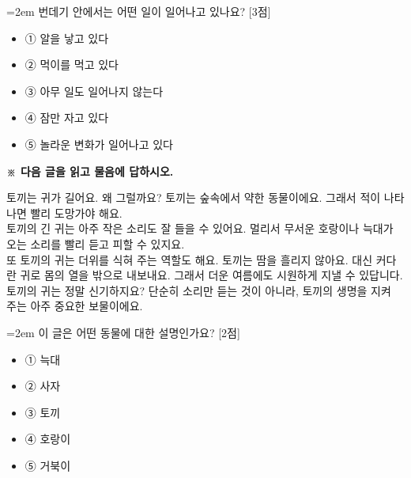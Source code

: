 \documentclass[12pt,a4paper]{article}
\newcommand{\qnum}[1]{%
  \tikz[baseline=(num.base)]{%
    \node[circle, fill=numCircle, text=white, inner sep=0pt,
          minimum size=18pt, font=\small\bfseries] (num) {#1};%
  }%
}
\newcommand{\pts}[1]{%
  \hfill\textcolor{ptsBadge}{[#1점]}%
}
\begin{document}
\vspace{4mm}
\begin{samepage}
{\hangindent=2em
\qnum{24}\enspace 번데기 안에서는 어떤 일이 일어나고 있나요? \pts{3}
\par}

\vspace{3mm}
\begin{itemize}[leftmargin=2.5em, labelsep=0.3em, label={}, itemsep=4pt, parsep=1pt, topsep=0pt]
  \item ① 알을 낳고 있다
  \item ② 먹이를 먹고 있다
  \item ③ 아무 일도 일어나지 않는다
  \item ④ 잠만 자고 있다
  \item ⑤ 놀라운 변화가 일어나고 있다
\end{itemize}
\end{samepage}

\vspace{4mm}
{\small\textbf{※ 다음 글을 읽고 물음에 답하시오.}}
\vspace{2mm}
\begin{tcolorbox}[passage]
토끼는 귀가 길어요. 왜 그럴까요? 토끼는 숲속에서 약한 동물이에요. 그래서 적이 나타나면 빨리 도망가야 해요. \\{}
토끼의 긴 귀는 아주 작은 소리도 잘 들을 수 있어요. 멀리서 무서운 호랑이나 늑대가 오는 소리를 빨리 듣고 피할 수 있지요. \\{}
또 토끼의 귀는 더위를 식혀 주는 역할도 해요. 토끼는 땀을 흘리지 않아요. 대신 커다란 귀로 몸의 열을 밖으로 내보내요. 그래서 더운 여름에도 시원하게 지낼 수 있답니다. \\{}
토끼의 귀는 정말 신기하지요? 단순히 소리만 듣는 것이 아니라, 토끼의 생명을 지켜 주는 아주 중요한 보물이에요.
\end{tcolorbox}
\vspace{3mm}
\begin{samepage}
{\hangindent=2em
\qnum{25}\enspace 이 글은 어떤 동물에 대한 설명인가요? \pts{2}
\par}

\vspace{3mm}
\begin{itemize}[leftmargin=2.5em, labelsep=0.3em, label={}, itemsep=4pt, parsep=1pt, topsep=0pt]
  \item ① 늑대
  \item ② 사자
  \item ③ 토끼
  \item ④ 호랑이
  \item ⑤ 거북이
\end{itemize}
\end{samepage}
\end{document}
